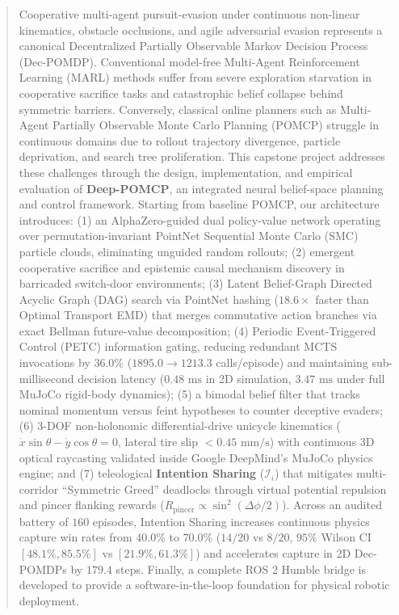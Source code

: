 \documentclass[conference]{IEEEtran}
\begin{document}
\begin{abstract}
Cooperative multi-agent pursuit-evasion under continuous non-linear kinematics, obstacle occlusions, and agile adversarial evasion represents a canonical Decentralized Partially Observable Markov Decision Process (Dec-POMDP). Conventional model-free Multi-Agent Reinforcement Learning (MARL) methods suffer from severe exploration starvation in cooperative sacrifice tasks and catastrophic belief collapse behind symmetric barriers. Conversely, classical online planners such as Multi-Agent Partially Observable Monte Carlo Planning (POMCP) struggle in continuous domains due to rollout trajectory divergence, particle deprivation, and search tree proliferation. This capstone project addresses these challenges through the design, implementation, and empirical evaluation of \textbf{Deep-POMCP}, an integrated neural belief-space planning and control framework. Starting from baseline POMCP, our architecture introduces: (1) an AlphaZero-guided dual policy-value network operating over permutation-invariant PointNet Sequential Monte Carlo (SMC) particle clouds, eliminating unguided random rollouts; (2) emergent cooperative sacrifice and epistemic causal mechanism discovery in barricaded switch-door environments; (3) Latent Belief-Graph Directed Acyclic Graph (DAG) search via PointNet hashing ($18.6\times$ faster than Optimal Transport EMD) that merges commutative action branches via exact Bellman future-value decomposition; (4) Periodic Event-Triggered Control (PETC) information gating, reducing redundant MCTS invocations by $36.0\%$ ($1895.0 \to 1213.3$ calls/episode) and maintaining sub-millisecond decision latency ($0.48\text{ ms}$ in 2D simulation, $3.47\text{ ms}$ under full MuJoCo rigid-body dynamics); (5) a bimodal belief filter that tracks nominal momentum versus feint hypotheses to counter deceptive evaders; (6) 3-DOF non-holonomic differential-drive unicycle kinematics ($\dot{x}\sin\theta - \dot{y}\cos\theta = 0$, lateral tire slip $< 0.45\text{ mm/s}$) with continuous 3D optical raycasting validated inside Google DeepMind's MuJoCo physics engine; and (7) teleological \textbf{Intention Sharing} ($\mathcal{I}_i$) that mitigates multi-corridor ``Symmetric Greed'' deadlocks through virtual potential repulsion and pincer flanking rewards ($R_{\text{pincer}} \propto \sin^2(\Delta\phi/2)$). Across an audited battery of $160$ episodes, Intention Sharing increases continuous physics capture win rates from $40.0\%$ to $\mathbf{70.0\%}$ ($14/20$ vs $8/20$, $95\%$ Wilson CI $[48.1\%, 85.5\%]$ vs $[21.9\%, 61.3\%]$) and accelerates capture in 2D Dec-POMDPs by $179.4$ steps. Finally, a complete ROS 2 Humble bridge is developed to provide a software-in-the-loop foundation for physical robotic deployment.
\end{abstract}
\end{document}
